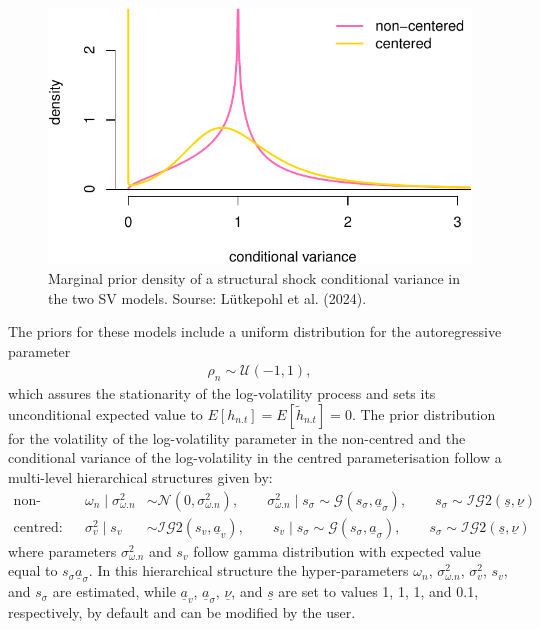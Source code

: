 \documentclass[
  nojss]{jss}
\begin{document}
\begin{CodeChunk}
\begin{figure}

{\centering \includegraphics{bsvars_files/figure-latex/plot_cv_prior-1} 

}

\caption[Marginal prior density of a structural shock conditional variance in the two SV models]{Marginal prior density of a structural shock conditional variance in the two SV models. Sourse: Lütkepohl et al. (2024).}\label{fig:plot_cv_prior}
\end{figure}
\end{CodeChunk}

The priors for these models include a uniform distribution for the
autoregressive parameter \begin{align}
\rho_n \sim\mathcal{U}(-1,1),
\end{align} which assures the stationarity of the log-volatility process
and sets its unconditional expected value to
\(E[h_{n.t}] = E[\tilde{h}_{n.t}] =0\). The prior distribution for the
volatility of the log-volatility parameter in the non-centred and the
conditional variance of the log-volatility in the centred
parameterisation follow a multi-level hierarchical structures given by:
\begin{align}
\text{non-centred:}&&\omega_n\mid \sigma_{\omega.n}^2 &\sim\mathcal{N}\left(0, \sigma_{\omega.n}^2\right),\qquad
\sigma_{\omega.n}^2 \mid s_\sigma\sim\mathcal{G}(s_\sigma, \underline{a}_\sigma), \qquad
s_\sigma \sim\mathcal{IG}2(\underline{s}, \underline{\nu})\\
\text{centred:}&&\sigma_v^2 \mid s_v &\sim\mathcal{IG}2(s_v, \underline{a}_v), \qquad
s_v \mid s_\sigma\sim\mathcal{G}(s_\sigma, \underline{a}_\sigma), \qquad
s_\sigma \sim\mathcal{IG}2(\underline{s}, \underline{\nu})
\end{align} where parameters \(\sigma_{\omega.n}^2\) and \(s_v\) follow
gamma distribution with expected value equal to
\(s_\sigma\underline{a}_\sigma\). In this hierarchical structure the
hyper-parameters \(\omega_n\), \(\sigma_{\omega.n}^2\), \(\sigma_v^2\),
\(s_v\), and \(s_\sigma\) are estimated, while \(\underline{a}_v\),
\(\underline{a}_\sigma\), \(\underline{\nu}\), and \(\underline{s}\) are
set to values 1, 1, 1, and 0.1, respectively, by default and can be
modified by the user.
\end{document}
